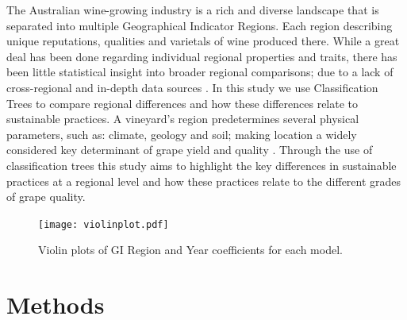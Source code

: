 \documentclass[review,12pt,authoryear]{elsarticle}
\begin{document}
\begin{linenumbers}
The Australian wine-growing industry is a rich and diverse landscape that is separated into multiple Geographical Indicator Regions. Each region describing unique reputations, qualities and varietals of wine produced there. While a great deal has been done regarding individual regional properties and traits, there has been little statistical insight into broader regional comparisons; due to a lack of cross-regional and in-depth data sources \citep{keithjonesAustralianWineIndustry2002,knightFirmResourcesDevelopment2019}. In this study we use Classification Trees to compare regional differences and how these differences relate to sustainable practices. 
\newline
A vineyard's region predetermines several physical parameters, such as: climate, geology and soil; making location a widely considered key determinant of grape yield and quality \citep{abbalDecisionSupportSystem2016,agostaRegionalClimateVariability2012,fragaMultivariateClusteringViticultural2017}. 
%
%
Through the use of classification trees this study aims to highlight the key differences in sustainable practices at a regional level and how these practices relate to the different grades of grape quality.


\begin{figure}
    \texttt{[image: violinplot.pdf]}
    \caption{Violin plots of GI Region and Year coefficients for each model.}\label{fig:violin}
    \end{figure}
\fi{}

\section{Methods}


\end{linenumbers}
\end{document}
